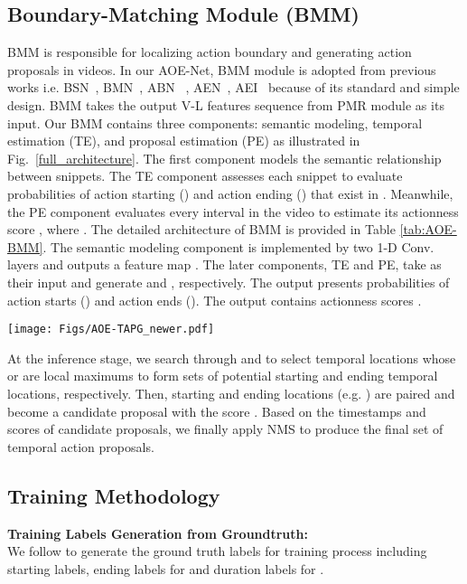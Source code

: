 \documentclass[sn-mathphys]{sn-jnl}
\theoremstyle{thmstyleone}\newtheorem{theorem}{Theorem}\newtheorem{proposition}[theorem]{Proposition}
\theoremstyle{thmstyletwo}\newtheorem{example}{Example}\newtheorem{remark}{Remark}
\theoremstyle{thmstylethree}\newtheorem{definition}{Definition}
\begin{document}
\subsection{Boundary-Matching Module (BMM)}
\label{subsec:bmm}

BMM is responsible for localizing action boundary and generating action proposals in videos. In our AOE-Net, BMM module is adopted from previous works i.e. BSN~\cite{lin2018bsn}, BMN~\cite{bmn}, ABN ~\cite{KhoaVo_ICASSP}, AEN~\cite{KhoaVo_Access}, AEI~\cite{khoavo_aei_bmvc21} because of its standard and simple design. BMM takes the output V-L features sequence  from PMR module as its input. Our BMM contains three components: semantic modeling, temporal estimation (TE), and proposal estimation (PE) as illustrated in Fig.~\ref{full_architecture}. The first component models the semantic relationship between snippets. The TE component assesses each snippet  to evaluate probabilities of action starting () and action ending () that exist in . Meanwhile, the PE component evaluates every interval  in the video to estimate its actionness score , where . The detailed architecture of BMM is provided in Table \ref{tab:AOE-BMM}. The semantic modeling component is implemented by two 1-D Conv. layers and outputs a feature map . The later components, TE and PE, take  as their input and generate  and , respectively. The output  presents probabilities of action starts () and action ends (). The output  contains actionness scores .


\begin{figure*}[t]
\centering
  \texttt{[image: Figs/AOE-TAPG\_newer.pdf]}
  \caption{The overall architecture of our proposed AOE-Net, consisting of perception-based multi-model representation module (PMR) and boundary-matching module (BMM).} \label{full_architecture}
\end{figure*}


At the inference stage, we search through  and  to select temporal locations  whose  or  are local maximums to form sets of potential starting and ending temporal locations, respectively. Then, starting and ending locations  (e.g. ) are paired and become a candidate proposal with the score . 
Based on the timestamps and scores of candidate proposals, we finally apply NMS \cite{SoftNMS, NMS} to produce the final set of temporal action proposals.




\subsection{Training Methodology}
\label{subsec:train_method}
\noindent\textbf{Training Labels Generation from Groundtruth:}\\
We follow \cite{bmn, lin2018bsn} to generate the ground truth labels for training process including starting labels, ending labels for  and duration labels for .
\end{document}
